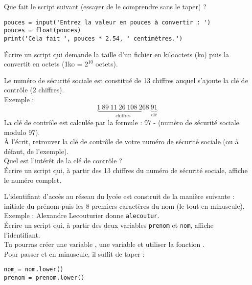 \begin{exercice}
    Que fait le script suivant (essayer de le comprendre sans le taper) ?
\begin{verbatim}
pouces = input('Entrez la valeur en pouces à convertir : ')
pouces = float(pouces)
print('Cela fait ', pouces * 2.54, ' centimètres.')
\end{verbatim}

    \'Ecrire un script qui demande la taille d'un fichier en kilooctets (ko) puis la convertit en octets (1ko = $2^{10}$ octets).
\end{exercice}
\begin{exercice}
    Le numéro de sécurité sociale est constitué de 13 chiffres auquel s'ajoute la clé de contrôle (2 chiffres).\\
    Exemple : $$\underbrace{1\ 89\ 11\ 26\ 108\ 268}_{\textrm{chiffres}}\ \underbrace{91}_{\textrm{clé}}$$
    La clé de contrôle est calculée par la formule : 97 - (numéro de sécurité sociale modulo 97).\\
    À l'écrit, retrouver la clé de contrôle de votre numéro de sécurité sociale (ou à défaut, de l'exemple).\\
    Quel est l'intérêt de la clé de contrôle ?\\
    \'Ecrire un script qui, à partir des 13 chiffres du numéro de sécurité sociale, affiche le numéro complet.
\end{exercice}
\begin{exercice}
    L'identifiant d'accès au réseau du lycée est construit de la manière suivante : initiale du prénom puis les 8 premiers caractères du nom (le tout en minuscule).\\
    Exemple : Alexandre Lecouturier donne \texttt{alecoutur}.\\
    \'Ecrire un script qui, à partir des deux variables \texttt{prenom} et \texttt{nom}, affiche l'identifiant.\\
    Tu pourras créer une variable , une variable  et utiliser la fonction .\\
    Pour passer  et  en minuscule, il suffit de taper :
    \begin{verbatim}
nom = nom.lower()
prenom = prenom.lower()
\end{verbatim}
\end{exercice}

